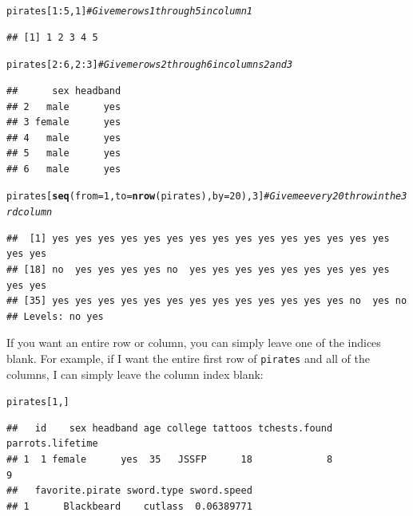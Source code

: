\documentclass{tufte-book}\usepackage[]{graphicx}\usepackage[]{color}
\makeatletter
\newcommand{\hlnum}[1]{\textcolor[rgb]{0.686,0.059,0.569}{#1}}%
\newcommand{\hlcom}[1]{\textcolor[rgb]{0.678,0.584,0.686}{\textit{#1}}}%
\newcommand{\hlopt}[1]{\textcolor[rgb]{0,0,0}{#1}}%
\newcommand{\hlstd}[1]{\textcolor[rgb]{0.345,0.345,0.345}{#1}}%
\newcommand{\hlkwc}[1]{\textcolor[rgb]{0.333,0.667,0.333}{#1}}%
\newcommand{\hlkwd}[1]{\textcolor[rgb]{0.737,0.353,0.396}{\textbf{#1}}}%
\newenvironment{kframe}{%
 \def\at@end@of@kframe{}%
 \ifinner\ifhmode%
  \def\at@end@of@kframe{\end{minipage}}%
  \begin{minipage}{\columnwidth}%
 \fi\fi%
 \def\FrameCommand##1{\hskip\@totalleftmargin \hskip-\fboxsep
 \colorbox{shadecolor}{##1}\hskip-\fboxsep
     \hskip-\linewidth \hskip-\@totalleftmargin \hskip\columnwidth}%
 \MakeFramed {\advance\hsize-\width
   \@totalleftmargin\z@ \linewidth\hsize
   \@setminipage}}%
 {\par\unskip\endMakeFramed%
 \at@end@of@kframe}
\newenvironment{knitrout}{}{} %
\makeatother
\begin{document}
\begin{footnotesize}
\begin{footnotesize}
\begin{knitrout}
\color{fgcolor}\begin{kframe}
\begin{alltt}
\hlstd{pirates[}\hlnum{1}\hlopt{:}\hlnum{5}\hlstd{,} \hlnum{1}\hlstd{]} \hlcom{# Give me rows 1 through 5 in column 1}
\end{alltt}
\begin{verbatim}
## [1] 1 2 3 4 5
\end{verbatim}
\begin{alltt}
\hlstd{pirates[}\hlnum{2}\hlopt{:}\hlnum{6}\hlstd{,} \hlnum{2}\hlopt{:}\hlnum{3}\hlstd{]} \hlcom{# Give me rows 2 through 6 in columns 2 and 3}
\end{alltt}
\begin{verbatim}
##      sex headband
## 2   male      yes
## 3 female      yes
## 4   male      yes
## 5   male      yes
## 6   male      yes
\end{verbatim}
\begin{alltt}
\hlstd{pirates[}\hlkwd{seq}\hlstd{(}\hlkwc{from} \hlstd{=} \hlnum{1}\hlstd{,} \hlkwc{to} \hlstd{=} \hlkwd{nrow}\hlstd{(pirates),} \hlkwc{by} \hlstd{=} \hlnum{20}\hlstd{),} \hlnum{3}\hlstd{]} \hlcom{# Give me every 20th row in the 3rd column}
\end{alltt}
\begin{verbatim}
##  [1] yes yes yes yes yes yes yes yes yes yes yes yes yes yes yes yes yes
## [18] no  yes yes yes yes no  yes yes yes yes yes yes yes yes yes yes yes
## [35] yes yes yes yes yes yes yes yes yes yes yes yes yes no  yes no 
## Levels: no yes
\end{verbatim}
\end{kframe}
\end{knitrout}
\end{footnotesize}

If you want an entire row or column, you can simply leave one of the indices blank. For example, if I want the entire first row of \texttt{pirates} and all of the columns, I can simply leave the column index blank:

\begin{footnotesize}
\begin{knitrout}
\color{fgcolor}\begin{kframe}
\begin{alltt}
\hlstd{pirates[}\hlnum{1}\hlstd{,]}
\end{alltt}
\begin{verbatim}
##   id    sex headband age college tattoos tchests.found parrots.lifetime
## 1  1 female      yes  35   JSSFP      18             8                9
##   favorite.pirate sword.type sword.speed
## 1      Blackbeard    cutlass  0.06389771
\end{verbatim}
\end{kframe}
\end{knitrout}
\end{footnotesize}


\end{footnotesize}
\end{document}

